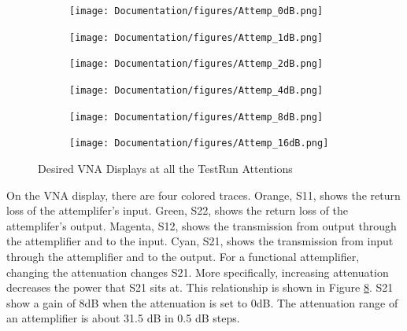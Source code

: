 \documentclass[12pt,a4paper,oneside]{article}
\begin{document}
\begin{figure}[H]
 \centering
 
 \begin{subfigure}[b]{.6\linewidth}
   \texttt{[image: Documentation/figures/Attemp\_0dB.png]}
   \caption{}
   \label{fig:test_0dB}
 \end{subfigure}
 
 \begin{subfigure}[b]{.6\linewidth}
  \centering
   \texttt{[image: Documentation/figures/Attemp\_1dB.png]}
   \caption{}
   \label{fig:test_1dB}
 \end{subfigure}
 
 \begin{subfigure}[b]{.6\linewidth}
  \centering
  \texttt{[image: Documentation/figures/Attemp\_2dB.png]}
  \caption{}
  \label{fig:test_2dB}
 \end{subfigure}

\end{figure}

\begin{figure}[H]\ContinuedFloat
 \centering
 
 \begin{subfigure}[b]{.6\linewidth}
   \texttt{[image: Documentation/figures/Attemp\_4dB.png]}
   \caption{}
   \label{fig:test_4dB}
 \end{subfigure}
 
 \begin{subfigure}[b]{.6\linewidth}
  \centering
   \texttt{[image: Documentation/figures/Attemp\_8dB.png]}
   \caption{}
   \label{fig:test_8dB}
 \end{subfigure}
 
 \begin{subfigure}[b]{.6\linewidth}
  \centering
  \texttt{[image: Documentation/figures/Attemp\_16dB.png]}
  \caption{}
  \label{fig:test_16dB}
 \end{subfigure}

 \caption{Desired VNA Displays at all the TestRun Attentions}
 \label{fig:Test_Run}
 
 
\end{figure}

On the VNA display, there are four colored traces. Orange, S11, shows the return loss of the attemplifer's input. Green, S22, shows the return loss of the attemplifer's output. Magenta, S12, shows the transmission from output through the attemplifier and to the input. Cyan, S21, shows the transmission from input through the attemplifier and to the output.  For a functional attemplifier, changing the attenuation changes S21. More specifically, increasing attenuation decreases the power that S21 sits at. This relationship is shown in Figure \ref{fig:Test_Run}. S21 show a gain of 8dB when the attenuation is set to 0dB. The attenuation range of an attemplifier is about 31.5 dB in 0.5 dB steps.
\end{document}
